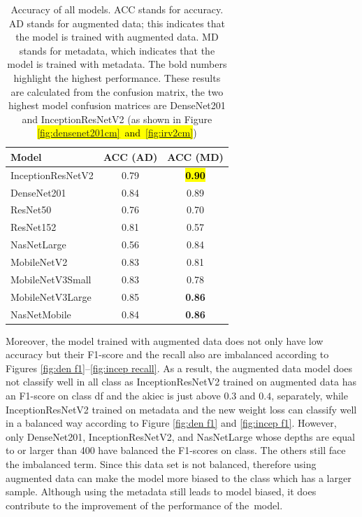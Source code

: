 \documentclass[sensors,article,accept,pdftex,moreauthors]{Definitions/mdpi}
\begin{document}
	\begin{table}[H]
		\caption{Accuracy of all models. ACC stands for accuracy. AD stands for augmented data; this indicates that the model is trained with augmented data. MD stands for metadata, which indicates that the model is trained with metadata. The bold numbers highlight the highest performance. These results are calculated from the confusion matrix, the two highest model confusion matrices are DenseNet201 and InceptionResNetV2 (as shown in Figure \hl{\mbox{\ref{fig:densenet201cm} and \ref{fig:irv2cm}}})}
		\label{table:overall-acc}
		\setlength{\tabcolsep}{12.38mm}\begin{tabular}{ l  c  c  }
\toprule
\textbf{Model} & \textbf{ACC (AD)} & \textbf{ACC (MD)}\\ 
\midrule
InceptionResNetV2 & 0.79 & \textbf{\hl{0.90} %
}\\
\midrule
DenseNet201 & 0.84 & 0.89\\
\midrule
ResNet50 & 0.76 & 0.70\\
\midrule
ResNet152 & 0.81 & 0.57\\
\midrule
NasNetLarge & 0.56 & 0.84\\
\midrule
MobileNetV2 & 0.83 & 0.81\\
\midrule
MobileNetV3Small & 0.83 & 0.78\\
\midrule
MobileNetV3Large & 0.85 & \textbf{0.86}\\
\midrule
NasNetMobile & 0.84 & \textbf{0.86}\\
\bottomrule
		\end{tabular}
	\end{table}
	
	Moreover, the model trained with augmented data does not only have low accuracy but their F1-score and the recall also are imbalanced according to Figures \ref{fig:den f1}--\ref{fig:incep recall}. As a result, the augmented data model does not classify well in all class as InceptionResNetV2 trained on augmented data has an F1-score on class df and the akiec is just above $0.3$ and $0.4$, separately, while InceptionResNetV2 trained on metadata and the new weight loss can classify well in a balanced way according to Figure \ref{fig:den f1} and \ref{fig:incep f1}. However, only DenseNet201, InceptionResNetV2, and NasNetLarge whose depths are equal to or larger than 400 have balanced the F1-scores on class. The others still face the imbalanced term. Since this data set is not balanced, therefore using augmented data can make the model more biased to the class which has a larger sample. Although using the metadata still leads to model biased, it does contribute to the improvement of the performance of the~model.
	
\end{document}
